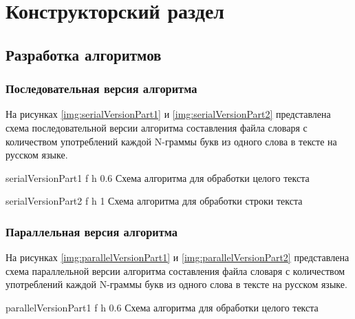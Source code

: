 \chapter{Конструкторский раздел}

\section{Разработка алгоритмов}

\subsection{Последовательная версия алгоритма}

На рисунках \ref{img:serialVersionPart1} и \ref{img:serialVersionPart2} представлена схема последовательной версии алгоритма составления файла словаря с количеством употреблений каждой N-граммы букв из одного слова в тексте на русском языке.

{serialVersionPart1} %
{f} %
{h} %
{0.6\textwidth} %
{Схема алгоритма для обработки целого текста} %

{serialVersionPart2} %
{f} %
{h} %
{1\textwidth} %
{Схема алгоритма для обработки строки текста} %

\clearpage

\subsection{Параллельная версия алгоритма}


На рисунках \ref{img:parallelVersionPart1} и \ref{img:parallelVersionPart2} представлена схема параллельной версии алгоритма составления файла словаря с количеством употреблений каждой N-граммы букв из одного слова в тексте на русском языке.

{parallelVersionPart1} %
{f} %
{h} %
{0.6\textwidth} %
{Схема алгоритма для обработки целого текста} %

